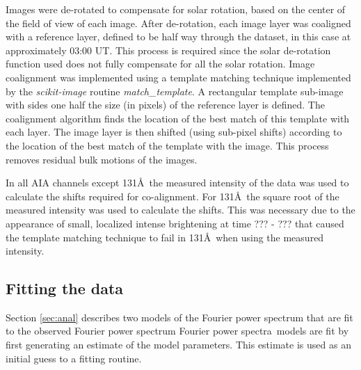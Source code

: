 \documentclass[onecolumn]{emulateapj}
\newcommand{\PA}{power spectra}
\newcommand{\Fpa}{Fourier \PA}
\begin{document}
Images were de-rotated to compensate for solar rotation, based on the
center of the field of view of each image.  After de-rotation, each
image layer was coaligned with a reference layer, defined to be half
way through the dataset, in this case at approximately 03:00 UT.  This
process is required since the solar de-rotation function used does not
fully compensate for all the solar rotation. Image coalignment was
implemented using a template matching technique \citep{lewis1995fast}
implemented by the {\it scikit-image} \citep{Vanderwalt2014} routine
{\it match\_template}.  A rectangular template sub-image with sides
one half the size (in pixels) of the reference layer is defined.  The
coalignment algorithm finds the location of the best match of this
template with each layer.  The image layer is then shifted (using
sub-pixel shifts) according to the location of the best match of the
template with the image.  This process removes residual bulk motions
of the images.

In all AIA channels except 131\AA\ the measured intensity of the data
was used to calculate the shifts required for co-alignment.  For
131\AA\ the square root of the measured intensity was used to
calculate the shifts.  This was necessary due to the appearance of
small, localized intense brightening at time ??? - ??? that caused the
template matching technique to fail in 131\AA\ when using the measured
intensity.


\subsection{Fitting the data}\label{sec:app:fit}
Section \ref{sec:anal} describes two models of the Fourier power
spectrum that are fit to the observed Fourier power spectrum
\Fpa\ models are fit by first generating an estimate of the model
parameters.  This estimate is used as an initial guess to a fitting
routine.
\end{document}
